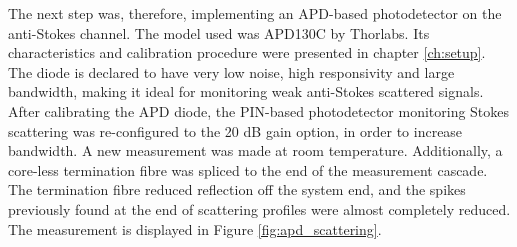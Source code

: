 \documentclass{standalone}
\begin{document}
The next step was, therefore, implementing an APD-based photodetector on the anti-Stokes channel. The model used was APD130C by Thorlabs. Its characteristics and calibration procedure were presented in chapter \ref{ch:setup}. The diode is declared to have very low noise, high responsivity and large bandwidth, making it ideal for monitoring weak anti-Stokes scattered signals. After calibrating the APD diode, the PIN-based photodetector monitoring Stokes scattering was re-configured to the 20 dB gain option, in order to increase bandwidth. A new measurement was made at room temperature. Additionally, a core-less termination fibre was spliced to the end of the measurement cascade. The termination fibre reduced reflection off the system end, and the spikes previously found at the end of scattering profiles were almost completely reduced. The measurement is displayed in Figure \ref{fig:apd_scattering}.
\end{document}
